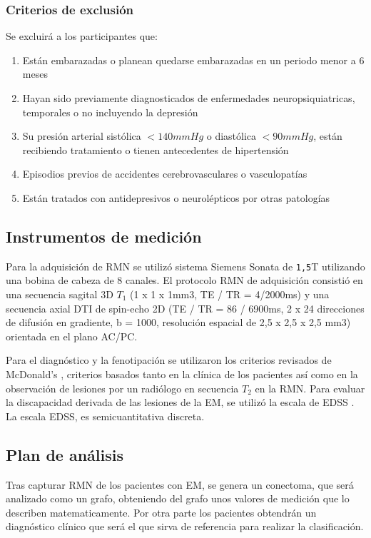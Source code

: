 \documentclass[fleqn,12pt]{UICArticle} %
\begin{document}
\subsubsection{Criterios de exclusión}
Se excluirá a los participantes que:
\begin{enumerate}[noitemsep]
\item Están embarazadas o planean quedarse embarazadas en un periodo menor a 6 meses
\item Hayan sido previamente diagnosticados de enfermedades neuropsiquiatricas, temporales o no incluyendo la depresión
\item Su presión arterial sistólica $< 140 mmHg$ o diastólica $< 90 mmHg$, están recibiendo tratamiento o tienen antecedentes de hipertensión
\item Episodios previos de accidentes cerebrovasculares o vasculopatías
\item Están tratados con antidepresivos o neurolépticos por otras patologías
\end{enumerate}


\subsection{Instrumentos de medición}
Para la adquisición de RMN se utilizó sistema Siemens Sonata de {\tt 1,5}T utilizando una bobina de cabeza de 8 canales. El protocolo RMN de adquisición consistió en una secuencia sagital 3D $T_1$ (1 x 1 x 1mm3, TE / TR = 4/2000ms) y una secuencia axial DTI de spin-echo 2D (TE / TR = 86 / 6900ms, 2 x 24 direcciones de difusión en gradiente, b = 1000, resolución espacial de 2,5 x 2,5 x 2,5 mm3) orientada en el plano AC/PC.

Para el diagnóstico y la fenotipación se utilizaron los criterios revisados de McDonald's \cite{Polman2011}, criterios basados tanto en la clínica de los pacientes así como en la observación de lesiones por un radiólogo en secuencia $T_2$ en la RMN. Para evaluar la discapacidad derivada de las lesiones de la EM, se utilizó la escala de EDSS \cite{Kurtzke1983}. La escala EDSS, es semicuantitativa discreta.

\subsection{Plan de análisis}

Tras capturar RMN de los pacientes con EM, se genera un conectoma, que será analizado como un grafo, obteniendo del grafo unos valores de medición que lo describen matematicamente. Por otra parte los pacientes obtendrán un diagnóstico clínico que será el que sirva de referencia para realizar la clasificación.
\end{document}
